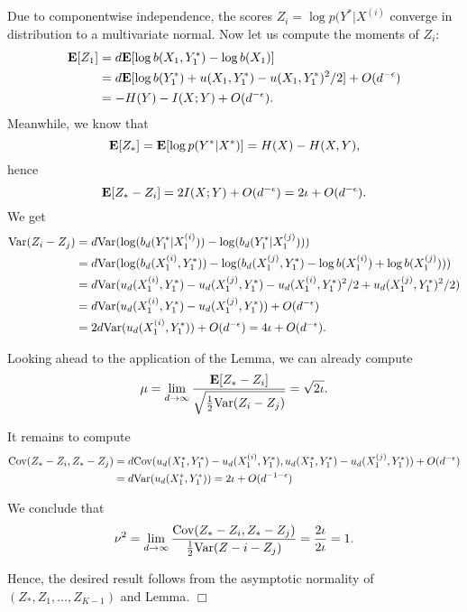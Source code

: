 \documentclass[12pt]{article}
\begin{document}
Due to componentwise independence, the scores $Z_i = \log
p(Y^*|X^{(i)}$ converge in distribution to a multivariate normal.  Now
let us compute the moments of $Z_i$:
\begin{align*}
\textbf{E}[Z_1] &= d\textbf{E}[\log b(X_1, Y_1^*) - \log b(X_1)]
\\&= d \textbf{E}[\log b(Y_1^*) + u(X_1,Y_1^*) - u(X_1, Y_1^*)^2/2] + O(d^{-\epsilon})
\\&= -H(Y) - I(X; Y) + O(d^{-\epsilon}).
\end{align*}
Meanwhile, we know that
\[
\textbf{E}[Z_*] = \textbf{E}[\log p(Y^*|X^*)] = H(X) - H(X, Y),
\]
hence
\[
\textbf{E}[Z_* - Z_i] = 2 I(X; Y) + O(d^{-\epsilon}) = 2\iota + O(d^{-\epsilon}).
\]
We get
\begin{align*}
\text{Var}(Z_i - Z_j) &= d\text{Var}(\log(b_d(Y_1^*|X_1^{(i)})) - \log(b_d(Y_1^*|X_1^{(j)})))
\\&= d\text{Var}(\log(b_d(X_1^{(i)}, Y_1^*)) - \log(b_d(X_1^{(j)}, Y_1^*) - \log b(X_1^{(i)}) + \log b(X_1^{(j)})))
\\&= d\text{Var}(u_d(X_1^{(i)}, Y_1^*) - u_d(X_1^{(j)}, Y_1^*) - u_d(X_1^{(i)}, Y_1^*)^2/2 + u_d(X_1^{(j)}, Y_1^*)^2/2)
\\&= d\text{Var}(u_d(X_1^{(i)}, Y_1^*) - u_d(X_1^{(j)}, Y_1^*)) + O(d^{-\epsilon})
\\&= 2d\text{Var}(u_d(X_1^{(i)}, Y_1^*)) + O(d^{-\epsilon}) = 4\iota+ O(d^{-\epsilon}).
\end{align*}

Looking ahead to the application of the Lemma, we can already compute
\[
\mu = \lim_{d \to \infty} \frac{\textbf{E}[Z_* - Z_i]}{\sqrt{\frac{1}{2} \text{Var}(Z_i - Z_j)}} = \sqrt{2\iota}.
\]

It remains to compute
\begin{align*}
\text{Cov}(Z_* - Z_i, Z_* - Z_j) &= d\text{Cov}(u_d(X_1^*, Y_1^*) - u_d(X_1^{(i)}, Y_1^*), 
u_d(X_1^*, Y_1^*) - u_d(X_1^{(j)}, Y_1^*)) + O(d^{-\epsilon})
\\&= d\text{Var}(u_d(X_1^*, Y_1^*)) = 2\iota + O(d^{-1-\epsilon})
\end{align*}

We conclude that
\[
\nu^2 = \lim_{d \to \infty} \frac{\text{Cov}(Z_* - Z_i, Z_* - Z_j)}{\frac{1}{2}\text{Var}(Z-i - Z_j)} = \frac{2\iota}{2\iota} = 1.
\]

Hence, the desired result follows from the asymptotic normality of
$(Z_*, Z_1,\hdots, Z_{K-1})$ and Lemma. $\Box$
\end{document}
